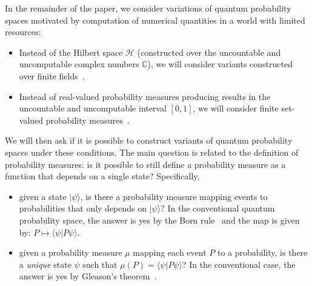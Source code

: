 \documentclass{article}
\theoremstyle{remark}
\newcommand{\Hilb}{\mathcal{H}}
\newcommand{\ket}[1]{|#1\rangle}
\newcommand{\ip}[2]{\langle #1 | #2 \rangle}
\begin{document}
In the remainder of the paper, we consider variations of quantum
probability spaces motivated by computation of numerical quantities in
a world with limited resources:
\begin{itemize}
\item Instead of the Hilbert space $\Hilb$ (constructed over the
  uncountable and uncomputable complex numbers $\mathbb{C}$), we will
  consider variants constructed over finite
  fields~\cite{HansonOrtizSabryEtAl2015,DQT2014,geometry2013}.
\item Instead of real-valued probability measures producing results in
  the uncountable and uncomputable interval $[0,1]$, we will consider
  finite set-valued probability measures~\cite{PuriRalescu1983}.
\end{itemize}
We will then ask if it is possible to construct variants of quantum
probability spaces under these conditions. The main question is
related to the definition of probability measures: is it possible to
still define a probability measure as a function that depends on a
single state? Specifically,
\begin{itemize}
\item given a state $\ket{\psi}$, is there a probability measure
  mapping events to probabilities that only depends on $\ket{\psi}$?
  In the conventional quantum probability space, the answer is yes by
  the Born rule~\cite{Born1983,Mermin2007} and the map is given by:
  $P \mapsto \ip{\psi}{P\psi}$.
\item given a probability measure $\mu$
  mapping each event $P$
  to a probability, is there a \emph{unique} state $\psi$
  such that $\mu(P)
  =
  \ip{\psi}{P\psi}$? In the conventional case, the answer is yes by
  Gleason's
  theorem~\cite{gleason1957,peres1995quantum,Redhead1987-REDINA}.
\end{itemize}
\end{document}
